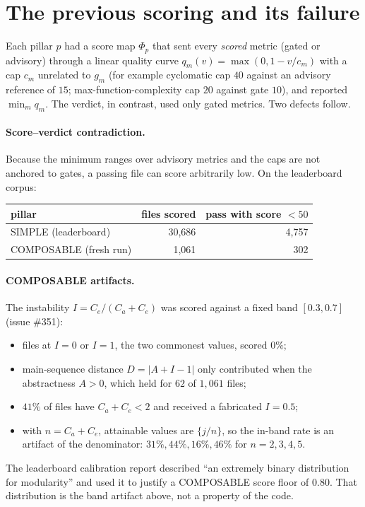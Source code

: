 \documentclass[11pt]{article}
\theoremstyle{remark}
\begin{document}
\section{The previous scoring and its failure}

Each pillar $p$ had a score map $\Phi_p$ that sent every \emph{scored} metric
(gated or advisory) through a linear quality curve $q_m(v) = \max(0, 1 - v/c_m)$
with a cap $c_m$ unrelated to $g_m$ (for example cyclomatic cap $40$ against an
advisory reference of $15$; max-function-complexity cap $20$ against gate $10$),
and reported $\min_m q_m$. The verdict, in contrast, used only gated metrics.
Two defects follow.

\paragraph{Score--verdict contradiction.} Because the minimum ranges over
advisory metrics and the caps are not anchored to gates, a passing file can
score arbitrarily low. On the leaderboard corpus:

\begin{center}
\begin{tabular}{lrr}
\toprule
pillar & files scored & pass with score $< 50$ \\
\midrule
SIMPLE (leaderboard) & 30{,}686 & 4{,}757 \\
COMPOSABLE (fresh run) & 1{,}061 & 302 \\
\bottomrule
\end{tabular}
\end{center}

\paragraph{COMPOSABLE artifacts.} The instability $I = C_e/(C_a + C_e)$ was
scored against a fixed band $[0.3, 0.7]$ (issue \#351):
\begin{itemize}
  \item files at $I = 0$ or $I = 1$, the two commonest values, scored $0\%$;
  \item main-sequence distance $D = |A + I - 1|$ only contributed when the
        abstractness $A > 0$, which held for $62$ of $1{,}061$ files;
  \item $41\%$ of files have $C_a + C_e < 2$ and received a fabricated
        $I = 0.5$;
  \item with $n = C_a + C_e$, attainable values are $\{j/n\}$, so the in-band
        rate is an artifact of the denominator: $31\%, 44\%, 16\%, 46\%$ for
        $n = 2, 3, 4, 5$.
\end{itemize}
The leaderboard calibration report described ``an extremely binary
distribution for modularity'' and used it to justify a COMPOSABLE score floor of
$0.80$. That distribution is the band artifact above, not a property of the
code.
\end{document}
